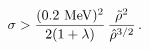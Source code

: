 \begin{equation}
\sigma > \frac{(0.2\,\,{\rm MeV})^2}{2 (1+\lambda)}\,
\frac{\tilde \rho^2 }{\hat \rho^{3/2}}\,.
\end{equation}


